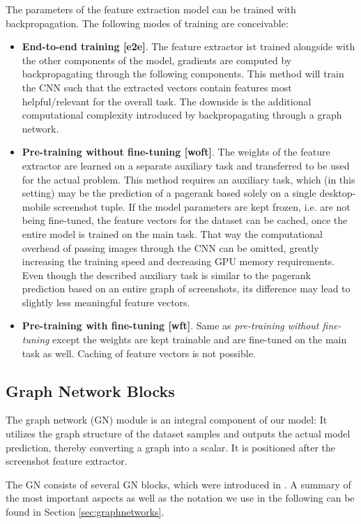 The parameters of the feature extraction model can be trained with backpropagation. The following modes of training are conceivable:
\begin{itemize}
    \item \textbf{End-to-end training [e2e]}. The feature extractor ist trained alongside with the other components of the model, gradients are computed by backpropagating through the following components. This method will train the CNN such that the extracted vectors contain features most helpful/relevant for the overall task. The downside is the additional computational complexity introduced by backpropagating through a graph network.
    \item \textbf{Pre-training without fine-tuning [woft]}. The weights of the feature extractor are learned on a separate auxiliary task and transferred to be used for the actual problem. This method requires an auxiliary task, which (in this setting) may be the prediction of a pagerank based solely on a single desktop-mobile screenshot tuple. If the model parameters are kept frozen, i.e. are not being fine-tuned, the feature vectors for the dataset can be cached, once the entire model is trained on the main task. That way the computational overhead of passing images through the CNN can be omitted, greatly increasing the training speed and decreasing GPU memory requirements. Even though the described auxiliary task is similar to the pagerank prediction based on an entire graph of screenshots, its difference may lead to slightly less meaningful feature vectors.
    \item \textbf{Pre-training with fine-tuning [wft]}. Same as \textit{pre-training without fine-tuning} except the weights are kept trainable and are fine-tuned on the main task as well. Caching of feature vectors is not possible.
\end{itemize}

\subsection{Graph Network Blocks}
\label{sec:gnblocks}

The graph network (GN) module is an integral component of our model: It utilizes the graph structure of the dataset samples and outputs the actual model prediction, thereby converting a graph into a scalar. It is positioned after the screenshot feature extractor.

The GN consists of several GN blocks, which were introduced in \cite{deepmind:graphnets}. A summary of the most important aspects as well as the notation we use in the following can be found in Section \ref{sec:graphnetworks}.


